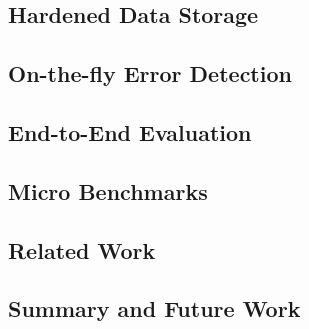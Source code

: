 \subsection{Hardened Data Storage}
\subsection{On-the-fly Error Detection}
\subsection{End-to-End Evaluation}
\subsection{Micro Benchmarks}
\subsection{Related Work}
\subsection{Summary and Future Work}